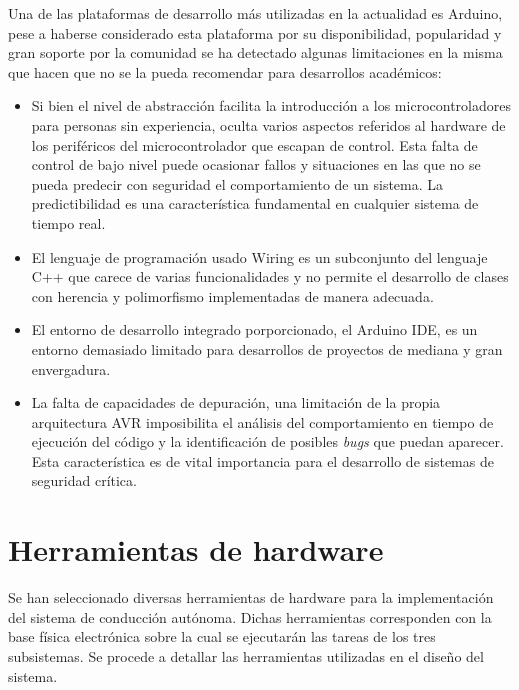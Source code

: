     Una de las plataformas de desarrollo más utilizadas en la actualidad es Arduino, pese a haberse considerado esta plataforma 
    por su disponibilidad, popularidad y gran soporte por la comunidad se ha detectado algunas limitaciones en la misma 
    que hacen que no se la pueda recomendar para desarrollos académicos:

    \begin{itemize}
        \item Si bien el nivel de abstracción facilita la introducción a los microcontroladores para personas 
        sin experiencia, oculta varios aspectos referidos al hardware de los periféricos del microcontrolador que 
        escapan de control. Esta falta de control de bajo nivel puede ocasionar fallos y situaciones en las que no 
        se pueda predecir con seguridad el comportamiento de un sistema. La predictibilidad es una característica 
        fundamental en cualquier sistema de tiempo real.

        \item El lenguaje de programación usado Wiring es un subconjunto del lenguaje C++ que carece de varias 
        funcionalidades y no permite el desarrollo de clases con herencia y polimorfismo implementadas de manera adecuada.

        \item El entorno de desarrollo integrado porporcionado, el Arduino IDE, es un entorno demasiado limitado 
        para desarrollos de proyectos de mediana y gran envergadura.

        \item La falta de capacidades de depuración, una limitación de la propia arquitectura AVR imposibilita el 
        análisis del comportamiento en tiempo de ejecución del código y la identificación de posibles \textit{bugs} 
        que puedan aparecer. Esta característica es de vital importancia para el desarrollo de sistemas de seguridad crítica.

    \end{itemize}


\section{Herramientas de hardware}
Se han seleccionado diversas herramientas de hardware para la implementación del sistema de conducción autónoma. Dichas herramientas
corresponden con la base física electrónica sobre la cual se ejecutarán las tareas de los tres subsistemas. Se procede a detallar 
las herramientas utilizadas en el diseño del sistema.

